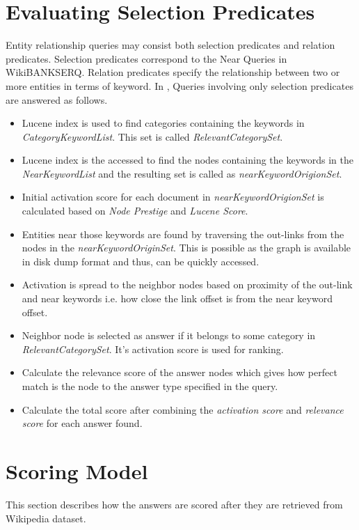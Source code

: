 \documentclass[11pt]{report}
\begin{document}
\section{Evaluating Selection Predicates}
Entity relationship queries may consist both selection predicates and relation predicates. Selection predicates correspond to the Near Queries in WikiBANKSERQ.
Relation predicates specify the relationship between two or more entities in terms of keyword. In \cite{wikibanks}, Queries involving only selection predicates
are answered as follows.
\begin{itemize}
 \item Lucene index is used to find categories containing the keywords in \textit{CategoryKeywordList}. This set is called \textit{RelevantCategorySet}.
 \item Lucene index is the accessed to find the nodes containing the keywords in the \textit{NearKeywordList} and the resulting set is called as \textit{nearKeywordOrigionSet}.
 \item Initial activation score for each document in \textit{nearKeywordOrigionSet} is calculated based on \textit{Node Prestige} and \textit{Lucene Score}.
 \item Entities near those keywords are found by traversing the out-links from the nodes in the \textit{nearKeywordOriginSet}. This is possible as the graph is available
in disk dump format and thus, can be quickly accessed.
 \item Activation is spread to the neighbor nodes based on proximity of the out-link and near keywords i.e. how close the link offset is from the near keyword offset.
 \item Neighbor node is selected as answer if it belongs to some category in \textit{RelevantCategorySet}. It's activation score is used for ranking.
 \item Calculate the relevance score of the answer nodes which gives how perfect match is the node to the answer type specified in the query.
 \item Calculate the total score after combining the \textit{activation score} and \textit{relevance score} for each answer found.
\end{itemize}

\section{Scoring Model}
This section describes how the answers are scored after they are retrieved from Wikipedia dataset.
\end{document}
